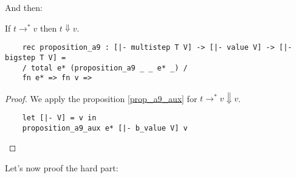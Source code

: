 And then:

\begin{proposition}[A9]
  If $t \longrightarrow^* v$ then $t \Downarrow v$.
  \begin{lstlisting}
    rec proposition_a9 : [|- multistep T V] -> [|- value V] -> [|- bigstep T V] =
    / total e* (proposition_a9 _ _ e* _) /
    fn e* => fn v =>
  \end{lstlisting}
\end{proposition}
\begin{proof}
  We apply the proposition \ref{prop_a9_aux} for $t \longrightarrow^* v
  \Downarrow v$.
  \begin{lstlisting}
    let [|- V] = v in
    proposition_a9_aux e* [|- b_value V] v
  \end{lstlisting}
\end{proof}

Let's now proof the hard part:

